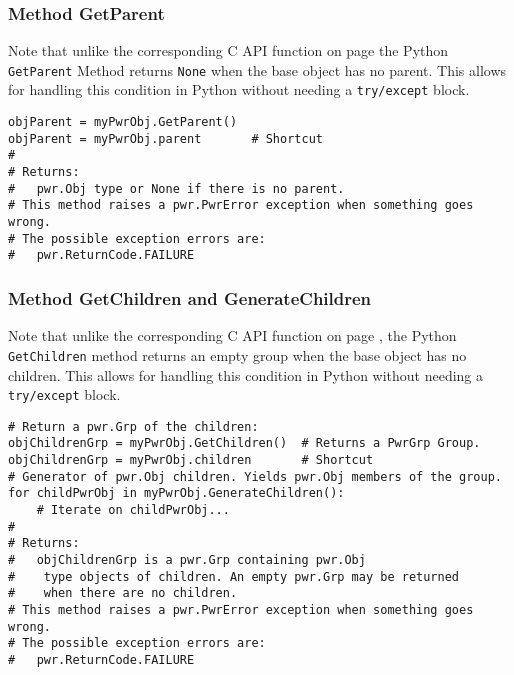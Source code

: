 \documentclass[12pt]{report} %
\begin{document}
\begin{appendices}
\subsubsection{Method GetParent} \label{meth:GetParent}

Note that unlike the corresponding C API function on page
\pageref{func:ObjGetParent} the Python \texttt{GetParent} Method returns \texttt{None}
when the base object has no parent. This allows for handling this condition in
Python without needing a \texttt{try/except} block.

\begin{center}\begin{minipage}{.95\linewidth}\begin{lstlisting}
objParent = myPwrObj.GetParent()
objParent = myPwrObj.parent       # Shortcut
#
# Returns:
#   pwr.Obj type or None if there is no parent.
# This method raises a pwr.PwrError exception when something goes wrong.
# The possible exception errors are:
#   pwr.ReturnCode.FAILURE
\end{lstlisting}\end{minipage}\end{center}

\subsubsection{Method GetChildren and GenerateChildren} \label{meth:GetChildren}

Note that unlike the corresponding C API function on page
\pageref{func:ObjGetChildren}, the Python \texttt{GetChildren} method returns an empty
group when the base object has no children. This allows for handling this
condition in Python without needing a \texttt{try/except} block.

\begin{center}\begin{minipage}{.95\linewidth}\begin{lstlisting}
# Return a pwr.Grp of the children:
objChildrenGrp = myPwrObj.GetChildren()  # Returns a PwrGrp Group.
objChildrenGrp = myPwrObj.children       # Shortcut
# Generator of pwr.Obj children. Yields pwr.Obj members of the group.
for childPwrObj in myPwrObj.GenerateChildren():
    # Iterate on childPwrObj...
#
# Returns:
#   objChildrenGrp is a pwr.Grp containing pwr.Obj
#    type objects of children. An empty pwr.Grp may be returned
#    when there are no children.
# This method raises a pwr.PwrError exception when something goes wrong.
# The possible exception errors are:
#   pwr.ReturnCode.FAILURE
\end{lstlisting}\end{minipage}\end{center}


\end{appendices}
\end{document}
